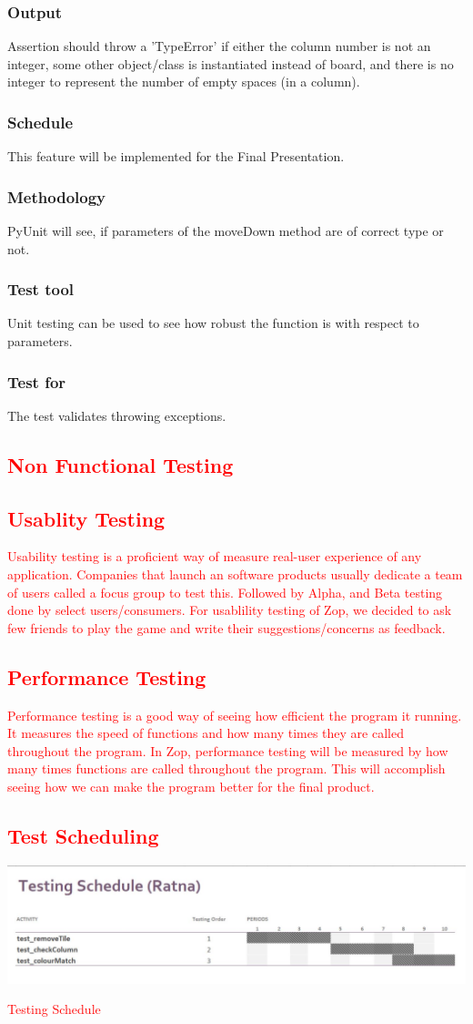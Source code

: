 \documentclass[12pt]{article}
\begin{document}
\subsubsection{Output}
Assertion should throw a 'TypeError' if either the column number is not an integer, some other object/class is instantiated instead of board, and there is no integer to represent the number of empty spaces (in a column).
\subsubsection{Schedule}
This feature will be implemented for the Final Presentation.
\subsubsection{Methodology}
PyUnit will see, if parameters of the moveDown method are of correct type or not. 
\subsubsection{Test tool}
Unit testing can be used to see how robust the function is with respect to parameters.
\subsubsection{Test for}
The test validates throwing exceptions.

\textcolor{red}{\section{Non Functional Testing}
\subsection{Usablity Testing}
Usability testing is a proficient way of measure real-user experience of any application. Companies that launch an software products usually dedicate a team of users called a focus group to test this. Followed by Alpha, and Beta testing done by select users/consumers. For usablility testing of Zop, we decided to ask few friends to play the game and write their suggestions/concerns as feedback.
\subsection{Performance Testing}
Performance testing is a good way of seeing how efficient the program it running.  It measures the speed of functions and how many times they are called throughout the program.  In Zop, performance testing will be measured by how many times functions are called throughout the program.  This will accomplish seeing how we can make the program better for the final product.}

\textcolor{red}{\section{Test Scheduling}
\begin{table}[h!]
\includegraphics[width = 17cm]{ratnaSchedule}
\caption{Testing Schedule}
\end{table}}
\end{document}
